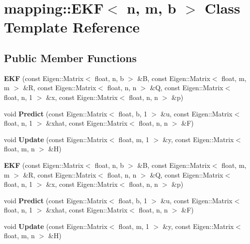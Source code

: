 \hypertarget{classmapping_1_1EKF}{}\section{mapping\+:\+:E\+KF$<$ n, m, b $>$ Class Template Reference}
\label{classmapping_1_1EKF}
\subsection*{Public Member Functions}
\begin{DoxyCompactItemize}
\item 
\mbox{\label{classmapping_1_1EKF_a7cd0997810543b9bcd1b7507c394141a}} 
{\bfseries E\+KF} (const Eigen\+::\+Matrix$<$ float, n, b $>$ \&B, const Eigen\+::\+Matrix$<$ float, m, m $>$ \&R, const Eigen\+::\+Matrix$<$ float, n, n $>$ \&Q, const Eigen\+::\+Matrix$<$ float, n, 1 $>$ \&x, const Eigen\+::\+Matrix$<$ float, n, n $>$ \&p)
\item 
\mbox{\label{classmapping_1_1EKF_afd006c8edcaec96df002a017d7088709}} 
void {\bfseries Predict} (const Eigen\+::\+Matrix$<$ float, b, 1 $>$ \&u, const Eigen\+::\+Matrix$<$ float, n, 1 $>$ \&xhat, const Eigen\+::\+Matrix$<$ float, n, n $>$ \&F)
\item 
\mbox{\label{classmapping_1_1EKF_a890e40b9407dbd02acbdea2a9d520060}} 
void {\bfseries Update} (const Eigen\+::\+Matrix$<$ float, m, 1 $>$ \&y, const Eigen\+::\+Matrix$<$ float, m, n $>$ \&H)
\item 
\mbox{\label{classmapping_1_1EKF_a7cd0997810543b9bcd1b7507c394141a}} 
{\bfseries E\+KF} (const Eigen\+::\+Matrix$<$ float, n, b $>$ \&B, const Eigen\+::\+Matrix$<$ float, m, m $>$ \&R, const Eigen\+::\+Matrix$<$ float, n, n $>$ \&Q, const Eigen\+::\+Matrix$<$ float, n, 1 $>$ \&x, const Eigen\+::\+Matrix$<$ float, n, n $>$ \&p)
\item 
\mbox{\label{classmapping_1_1EKF_afd006c8edcaec96df002a017d7088709}} 
void {\bfseries Predict} (const Eigen\+::\+Matrix$<$ float, b, 1 $>$ \&u, const Eigen\+::\+Matrix$<$ float, n, 1 $>$ \&xhat, const Eigen\+::\+Matrix$<$ float, n, n $>$ \&F)
\item 
\mbox{\label{classmapping_1_1EKF_a890e40b9407dbd02acbdea2a9d520060}} 
void {\bfseries Update} (const Eigen\+::\+Matrix$<$ float, m, 1 $>$ \&y, const Eigen\+::\+Matrix$<$ float, m, n $>$ \&H)
\end{DoxyCompactItemize}
